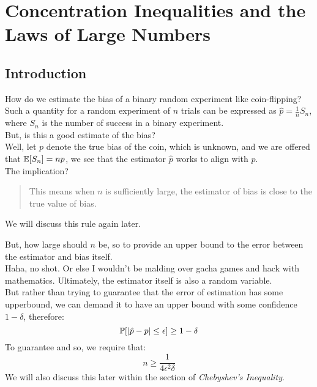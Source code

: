 \chapter{Concentration Inequalities and the Laws of Large Numbers}

\section{Introduction}
How do we estimate the bias of a binary random experiment like coin-flipping? \\
Such a quantity for a random experiment of $n$ trials can be expressed as $\hat{p} = \frac{1}{n} S_n$, where $S_n$ is the number of success in a binary experiment. \\
But, is this a good estimate of the bias? \\
Well, let $p$ denote the true bias of the coin, which is unknown, and we are offered that $\E[S_n] = np$, we see that the estimator $\hat{p}$ works to align with $p$. \\
The implication?
\begin{quote}
    This means when $n$ is sufficiently large, the estimator of bias is close to the true value of bias.
\end{quote}
We will discuss this rule again later.

But, how large should $n$ be, so to provide an upper bound to the error between the estimator and bias itself. \\
Haha, no shot. Or else I wouldn't be malding over gacha games and hack with mathematics. Ultimately, the estimator itself is also a random variable. \\
But rather than trying to guarantee that the error of estimation has some upperbound, we can demand it to have an upper bound with some confidence $1 - \delta$, therefore:
\[\P[|\hat{p} - p| \leq \epsilon] \geq 1 - \delta\]
To guarantee and so, we require that:
\[n \geq \frac{1}{4 \epsilon^2 \delta}\]
We will also discuss this later within the section of \textit{Chebyshev's Inequality}.

